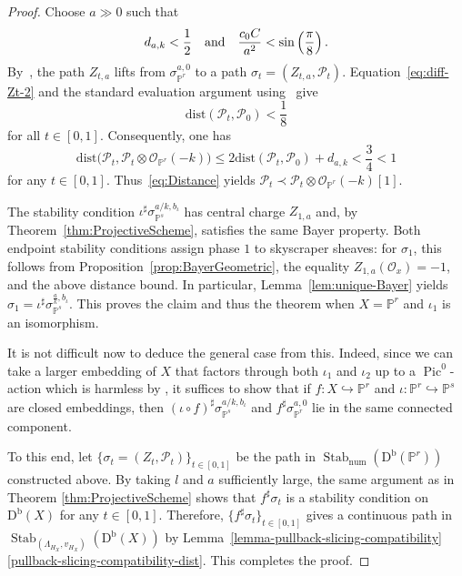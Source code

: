 \documentclass[11pt, reqno]{amsart}
\numberwithin{equation}{section}
\theoremstyle{plain}
\theoremstyle{remark}
\theoremstyle{definition}
\theoremstyle{italicsname}
\newcommand{\Db}{\mathrm{D^b}}
\newcommand{\num}{\mathrm{num}}
\DeclareMathOperator{\Stab}{Stab}
\DeclareMathOperator{\Pic}{Pic}
\newcommand{\cO}{\mathcal{O}}
\newcommand{\cP}{\mathscr{P}}
\def\PP{\ensuremath{\mathbb{P}}}
\begin{document}
\begin{proof}
Choose $a\gg0$ such that
\[
d_{a,k}<\frac12\quad\textup{and}\quad
\frac{c_0C}{a^2}<\sin\left(\frac{\pi}{8}\right).
\]
By~\cite[Theorem~1.2]{bayer:short-proof}, the path $Z_{t,a}$ lifts from
$\sigma_{\PP^r}^{a,0}$ to a path
$\sigma_t=(Z_{t,a},\cP_t)$. Equation~\eqref{eq:diff-Zt-2} and the standard evaluation argument using~\cite[Lemma~2.9]{bayer:short-proof} give
\[
\mathrm{dist}(\cP_t,\cP_0)<\frac18
\]
for all $t\in[0,1]$. Consequently, one has
\[
\mathrm{dist}\bigl(
\cP_t,\cP_t\otimes\cO_{\PP^r}(-k)
\bigr)
\leq2\mathrm{dist}(\cP_t,\cP_0)+d_{a,k}
<\frac34<1
\]
for any $t\in[0,1]$. Thus~\eqref{eq:Distance} yields $\cP_t\prec\cP_t\otimes\cO_{\PP^r}(-k)[1]$.

The stability condition
$\iota^\sharp\sigma_{\PP^s}^{a/k,b_\iota}$ has central charge
$Z_{1,a}$ and, by Theorem~\ref{thm:ProjectiveScheme}, satisfies the
same Bayer property. Both endpoint stability conditions assign phase $1$ to skyscraper sheaves: for $\sigma_1$, this follows from Proposition~\ref{prop:BayerGeometric}, the equality
$Z_{1,a}(\cO_x)=-1$, and the above distance bound. In particular,
Lemma~\ref{lem:unique-Bayer} yields
$\sigma_1=\iota^{\sharp}\sigma_{\PP^s}^{\frac{a}{k},b_{\iota}}$. This proves the claim and thus the theorem when $X=\PP^r$ and $\iota_1$ is an isomorphism.

It is not difficult now to deduce the general case from this. 
Indeed, since we can take a larger embedding of $X$ that factors through both $\iota_1$ and $\iota_2$ up to a $\Pic^0$-action which is harmless by \cite[Theorem~2.23(1)]{curves}, it suffices to show that if $f\colon X\hookrightarrow \PP^r$ and $\iota\colon \PP^r\hookrightarrow \PP^s$ are closed embeddings, then $(\iota\circ f)^{\sharp}\sigma_{\PP^s}^{a/k,b_{\iota}}$ and $f^{\sharp}\sigma_{\PP^r}^{a,0}$ lie in the same connected component. 

To this end, let $\{\sigma_t=(Z_t, \cP_t)\}_{t\in [0,1]}$ be the path in $\Stab_{\num}(\Db(\PP^r))$ constructed above. By taking $l$ and $a$ sufficiently large, the same argument as in Theorem \ref{thm:ProjectiveScheme} shows that $f^{\sharp}\sigma_t$ is a stability condition on $\Db(X)$ for any $t\in [0,1]$. Therefore, $\{f^{\sharp}\sigma_t\}_{t\in [0,1]}$ gives a continuous path in $\Stab_{(\Lambda_{H_X}, v_{H_X})}(\Db(X))$ by Lemma~\ref{lemma-pullback-slicing-compatibility}\ref{pullback-slicing-compatibility-dist}. This completes the proof.
\end{proof}


\end{document}
